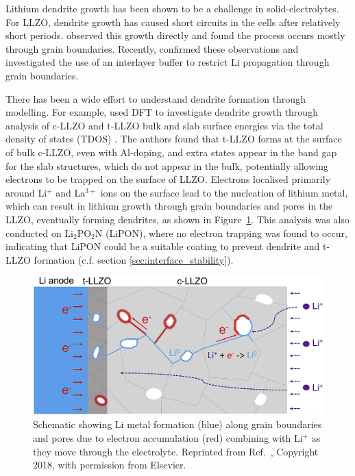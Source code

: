 \documentclass[../main.tex]{subfiles}
\begin{document}
Lithium dendrite growth has been shown to be a challenge in solid-electrolytes. For LLZO, dendrite growth has caused short circuits in the cells after relatively short periods\cite{Ren2015,Sudo2014}. \citeauthor{Cheng2017} observed this growth directly and found the process occurs mostly through grain boundaries.\cite{Cheng2017} Recently, \citeauthor{Kim2020} confirmed these observations and investigated the use of an interlayer buffer to restrict Li propagation through grain boundaries.\cite{Kim2020}

There has been a wide effort to understand dendrite formation through modelling\cite{Canepa2018, Tian2018, Gao2020}. For example, \citeauthor{Tian2018} used DFT to investigate dendrite growth through analysis of c-LLZO and t-LLZO bulk and slab surface energies via the total density of states (TDOS) \cite{Tian2018}. The authors found that t-LLZO forms at the surface of bulk c-LLZO, even with Al-doping\cite{Ma2016, Rettenwander2018}, and extra states appear in the band gap for the slab structures, which do not appear in the bulk, potentially allowing electrons to be trapped on the surface of LLZO. Electrons localised primarily around Li$^+$ and La$^{3+}$ ions on the surface lead to the nucleation of lithium metal, which can result in lithium growth through grain boundaries and pores in the LLZO, eventually forming dendrites\cite{Ren2015}, as shown in Figure~\ref{fig:tian2020}. This analysis was also conducted on Li$_2$PO$_2$N (LiPON), where no electron trapping was found to occur, indicating that LiPON could be a suitable coating to prevent dendrite and t-LLZO formation (c.f. section \ref{sec:interface_stability}).

\begin{figure}[H]
    \centering
    \includegraphics[scale=0.3]{figures/tian_grain_growth.png}
    \caption{Schematic showing Li metal formation (blue) along grain boundaries and pores due to electron accumulation (red) combining with Li$^+$ as they move through the electrolyte. Reprinted from Ref.~, Copyright 2018, with permission from Elsevier.}
    \label{fig:tian2020}
\end{figure}
\end{document}
